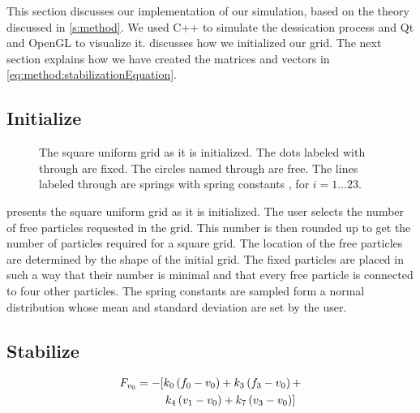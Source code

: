 This section discusses our implementation of our simulation, based on the theory discussed in \cref{s:method}. We used C++ to simulate the dessication process and  Qt\cite{qt} and OpenGL\cite{openGL} to visualize it.  discusses how we initialized our grid. The next section explains how we have created the matrices and vectors in \cref{eq:method:stabilizationEquation}.

\subsection{Initialize}
\label{s:implementation:init}

\begin{figure}
	\centering
	\resizebox{0.9\columnwidth}{!}{%
		\initialGrid
	}
	\caption{The square uniform grid as it is initialized. The dots labeled with  through  are fixed. The circles named  through  are free. The lines labeled  through  are springs with spring constants , for $i = 1\ldots23$.}
	\label{fig:implementation:intitialGrid}
\end{figure}

 presents the square uniform grid as it is initialized. 
The user selects the number of free particles requested in the grid. This number is then rounded up to get the number of particles required for a square grid. The location of the free particles are determined by the shape of the initial grid.
The fixed particles are placed  in such a way that their number is minimal and that every free particle is connected to four other particles. 
The spring constants are sampled form a normal distribution whose mean and standard deviation are set by the user. 

\subsection{Stabilize}
\label{s:implementation:stabilize}



\begin{equation}\label{eq:implementation:forceOnVo}
	\begin{split}
	F_{v_{0}} 	& = - [				k_{0} \left(f_{0} - v_{0}\right) +
												k_{3} \left(f_{3} - v_{0}\right) + \\
							& \quad\quad\;\;	k_{4} \left(v_{1} - v_{0}\right)  +
												k_{7} \left(v_{3} - v_{0}\right) ]
	\end{split}
\end{equation}


